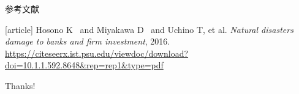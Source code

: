 \documentclass[UTF8, aspectratio=169 , 10pt，punct=kaiming]{beamer} %
\begin{document}
\begin{frame}[allowframebreaks]{参考文献}
  \scriptsize
  \begin{thebibliography}{}
  [article]
        Hosono K \ and Miyakawa D \ and Uchino T, et al.
        \newblock \emph{Natural disasters damage to banks and firm investment}, 2016.
        \newblock \url{https://citeseerx.ist.psu.edu/viewdoc/download?doi=10.1.1.592.8648&rep=rep1&type=pdf}





  \end{thebibliography}
\end{frame}

\begin{frame}[plain]
  \begin{center}
    {\Huge\calligra Thanks!}
  \end{center}
\end{frame}
\end{document}
